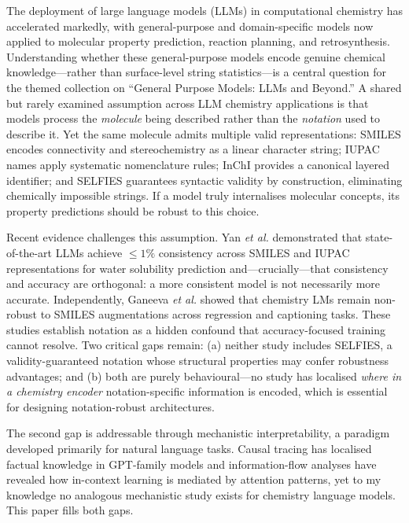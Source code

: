 \documentclass[twoside,twocolumn,9pt]{article}
\begin{document}
The deployment of large language models (LLMs) in computational chemistry has accelerated markedly, with general-purpose and domain-specific models now applied to molecular property prediction, reaction planning, and retrosynthesis.\cite{bran2024,white2023,jablonka2024,jablonka2024predictive} Understanding whether these general-purpose models encode genuine chemical knowledge---rather than surface-level string statistics---is a central question for the themed collection on ``General Purpose Models: LLMs and Beyond.'' A shared but rarely examined assumption across LLM chemistry applications is that models process the \textit{molecule} being described rather than the \textit{notation} used to describe it. Yet the same molecule admits multiple valid representations: SMILES\cite{weininger1988} encodes connectivity and stereochemistry as a linear character string; IUPAC names apply systematic nomenclature rules; InChI\cite{heller2015} provides a canonical layered identifier; and SELFIES\cite{krenn2020} guarantees syntactic validity by construction, eliminating chemically impossible strings. If a model truly internalises molecular concepts, its property predictions should be robust to this choice.

Recent evidence challenges this assumption. Yan \textit{et al.}\cite{yan2025} demonstrated that state-of-the-art LLMs achieve $\leq1\%$ consistency across SMILES and IUPAC representations for water solubility prediction and---crucially---that consistency and accuracy are orthogonal: a more consistent model is not necessarily more accurate. Independently, Ganeeva \textit{et al.}\cite{ganeeva2025} showed that chemistry LMs remain non-robust to SMILES augmentations across regression and captioning tasks. These studies establish notation as a hidden confound that accuracy-focused training cannot resolve. Two critical gaps remain: (a) neither study includes SELFIES, a validity-guaranteed notation whose structural properties may confer robustness advantages; and (b) both are purely behavioural---no study has localised \textit{where in a chemistry encoder} notation-specific information is encoded, which is essential for designing notation-robust architectures.

The second gap is addressable through mechanistic interpretability, a paradigm developed primarily for natural language tasks. Causal tracing has localised factual knowledge in GPT-family models\cite{meng2022} and information-flow analyses have revealed how in-context learning is mediated by attention patterns,\cite{wang2023} yet to my knowledge no analogous mechanistic study exists for chemistry language models. This paper fills both gaps.
\end{document}
